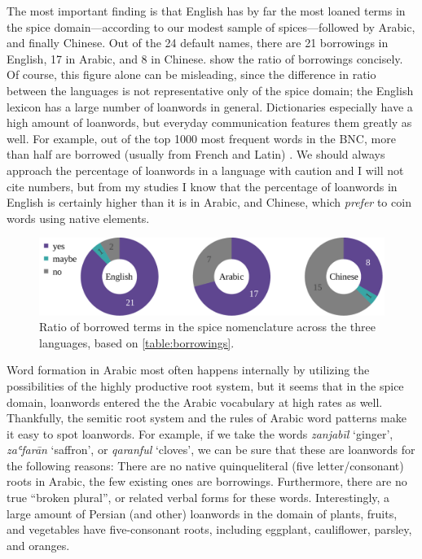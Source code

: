 The most important finding is that English has by far the most loaned terms in the spice domain---according to our modest sample of spices---followed by Arabic, and finally Chinese. Out of the 24 default names, there are 21 borrowings in English, 17 in Arabic, and 8 in Chinese.  show the ratio of borrowings concisely. Of course, this figure alone can be misleading, since the difference in ratio between the languages is not representative only of the spice domain; the English lexicon has a large number of loanwords in general. Dictionaries especially have a high amount of loanwords, but everyday communication features them greatly as well. For example, out of the top 1000 most frequent words in the \gls{BNC}, more than half are borrowed (usually from French and Latin) \autocite[38]{durkin_borrowed_2014}. We should always approach the percentage of loanwords in a language with caution and I will not cite numbers, but from my studies I know that the percentage of loanwords in English is certainly higher than it is in Arabic, and Chinese, which \textit{prefer} to coin words using native elements. 

\begin{figure}[ht!]
  \includegraphics[width=\linewidth]{imgs/plots/borrowing_pie.pdf}
  \caption[{Ratio of borrowed and not borrowed terms in the spice nomenclature.}]{Ratio of borrowed terms in the spice nomenclature across the three languages, based on \cref{table:borrowings}.}
  \label{fig:borrowing_pie}
\end{figure}

Word formation in Arabic most often happens internally by utilizing the possibilities of the highly productive root system, but it seems that in the spice domain, loanwords entered the the Arabic vocabulary at high rates as well. Thankfully, the semitic root system and the rules of Arabic word patterns make it easy to spot loanwords. For example, if we take the words \textit{zanjabīl} `ginger', \textit{zaʿfarān} `saffron', or \textit{qaranful} `cloves', we can be sure that these are loanwords for the following reasons: There are no native quinqueliteral (five letter/consonant) roots in Arabic, the few existing ones are borrowings. Furthermore, there are no true ``broken plural'', or related verbal forms for these words. Interestingly, a large amount of Persian (and other) loanwords in the domain of plants, fruits, and vegetables have five-consonant roots, including eggplant, cauliflower, parsley, and oranges.

